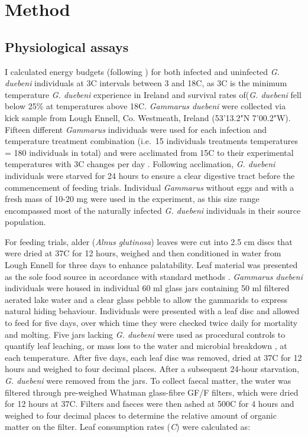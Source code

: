 \section{Method}

\subsection{Physiological assays}

I calculated energy budgets (following \citet{nilsson1974}) for both infected and uninfected \emph{G. duebeni} individuals at 3\degree C intervals between 3 and 18\degree C, as 3\degree C is the minimum temperature \emph{G. duebeni} experience in Ireland and survival rates of(\emph{G. duebeni} fell below 25\% at temperatures above 18\degree C. \emph{Gammarus duebeni} were collected via kick sample from Lough Ennell, Co. Westmeath, Ireland (53'13.2"N 7'00.2"W). Fifteen different \emph{Gammarus} individuals were used for each infection and temperature treatment combination (i.e.\ 15 individuals  treatments  temperatures = 180 individuals in total) and were acclimated from 15\degree C to their experimental temperatures with 3\degree C changes per day \citep{penk2016}. Following acclimation, \emph{G. duebeni} individuals were starved for 24 hours to ensure a clear digestive tract before the commencement of feeding trials. Individual \emph{Gammarus} without eggs and with a fresh mass of 10-20 mg were used in the experiment, as this size range encompassed most of the naturally infected \emph{G. duebeni} individuals in their source population.

For feeding trials, alder (\emph{Alnus glutinosa})  leaves were cut into 2.5 cm discs that were dried at 37\degree C for 12 hours, weighed and then conditioned in water from Lough Ennell for three days to enhance palatability. Leaf material was presented as the sole food source in accordance with standard methods \citep{agatz2014}. \emph{Gammarus duebeni} individuals were housed in individual 60 ml glass jars containing 50 ml filtered aerated lake water and a clear glass pebble to allow the gammarids to express natural hiding behaviour. Individuals were presented with a leaf disc and allowed to feed for five days, over which time they were checked twice daily for mortality and molting. Five jars lacking \emph{G. duebeni} were used as procedural controls to quantify leaf leaching, or mass loss to the water and microbial breakdown \citep{webster1986}, at each temperature. After five days, each leaf disc was removed, dried at 37\degree C for 12 hours and weighed to four decimal places. After a subsequent 24-hour starvation, \emph{G. duebeni} were removed from the jars. To collect faecal matter, the water was filtered through pre-weighed Whatman glass-fibre GF/F filters, which were dried for 12 hours at 37\degree C. Filters and faeces were then ashed at 500\degree C for 4 hours and weighed to four decimal places to determine the relative amount of organic matter on the filter.  Leaf consumption rates (\emph{C}) were calculated as:

